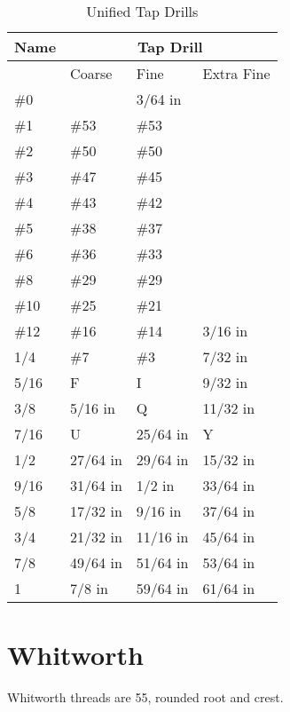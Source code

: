 






\begin{table}[h!]
    \footnotesize
\begin{longtable}{l|lll}
	Name
    &\multicolumn{3}{c}{Tap Drill}
    \\
\hline
    &Coarse
    &Fine
    &Extra Fine
    \\
\hline

\#0 &&3/64 in &\\
\#1 &\#53 &\#53 &\\
\#2 &\#50 &\#50 &\\
\#3 &\#47 &\#45 &\\
\#4 &\#43 &\#42 &\\
\#5 &\#38 &\#37 &\\
\#6 &\#36 &\#33 &\\
\#8 &\#29 &\#29 &\\
\#10 &\#25 &\#21 &\\
\#12 &\#16 &\#14 &3/16 in\\
1/4 &\#7 &\#3 &7/32 in\\
5/16 &F &I &9/32 in\\
3/8 &5/16 in &Q &11/32 in\\
7/16 &U &25/64 in &Y\\
1/2 &27/64 in &29/64 in &15/32 in\\
9/16 &31/64 in &1/2 in &33/64 in\\
5/8 &17/32 in &9/16 in &37/64 in\\
3/4 &21/32 in &11/16 in &45/64 in\\
7/8 &49/64 in &51/64 in &53/64 in\\
1 &7/8 in &59/64 in &61/64 in\\
\end{longtable}
\caption{Unified Tap Drills}
\end{table}




\clearpage
\section{Whitworth}
Whitworth threads are 55\degree, rounded root and crest.
\\ \\ \\ \\ \\ \\ \\ \\ \\ \\ \\ \\ \\ \\ \\ \\ \\ \\               
